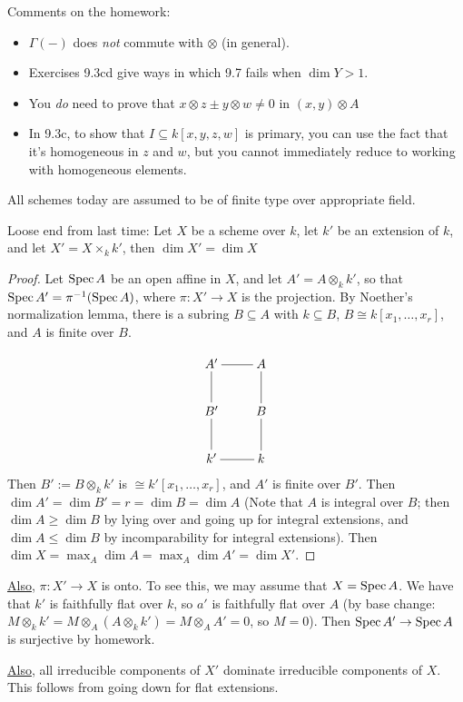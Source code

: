  \setcounter{lecture}{27}

 Comments on the homework:
 \begin{itemize}
 \item $\Gamma(-)$ does \emph{not} commute with $\otimes$ (in
 general).
 \item Exercises 9.3cd give ways in which 9.7 fails when $\dim Y
 >1$.
 \item You \emph{do} need to prove that $x\otimes z \pm y\otimes
 w\not=0$ in $(x,y)\otimes A$
 \item In 9.3c, to show that $I\subseteq k[x,y,z,w]$ is primary,
 you can use the fact that it's homogeneous in $z$ and $w$, but
 you cannot immediately reduce to working with homogeneous
 elements.
 \end{itemize}

 All schemes today are assumed to be of finite type over
 appropriate field.

 Loose end from last time:  Let $X$ be a scheme over $k$, let
 $k'$ be an extension of $k$, and let $X'=X\times_k k'$, then
 $\dim X' = \dim X$
 \begin{proof}
 Let $\text{\rm Spec\,} A$ be an open affine in $X$, and let $A'=A\otimes_k
 k'$, so that $\text{\rm Spec\,} A' = \pi^{-1}(\text{\rm Spec\,} A)$, where $\pi:X'\to X$
 is the projection.  By Noether's normalization lemma, there is a
 subring $B\subseteq A$ with $k\subseteq B$, $B\cong k[x_1,\dots,
 x_r]$, and $A$ is finite over $B$.

 \[\xymatrix{
  A'\ar@{-}[r]\ar@{-}[d] & A\ar@{-}[d] \\
  B'\ar@{-}[d] & B\ar@{-}[d] \\
  k' \ar@{-}[r] & k
 }\]
 Then $B':=B\otimes_k k'$ is $\cong k'[x_1,\dots,x_r]$, and $A'$
 is finite over $B'$.  Then $\dim A'= \dim B' = r = \dim B = \dim
 A$ (Note that $A$ is integral over $B$; then $\dim A \ge \dim B$
 by lying over and going up for integral extensions, and $\dim
 A\le \dim B$ by incomparability for integral extensions).  Then
 $\dim X = \max_A \dim A = \max_A \dim A' = \dim X'$.
 \end{proof}

 \underline{Also}, $\pi:X'\to X$ is onto.  To see this, we may assume that $X=\text{\rm Spec\,}
 A$.  We have that $k'$ is faithfully flat over $k$, so $a'$ is
 faithfully flat over $A$ (by base change: $M\otimes_k k' =
 M\otimes_A(A\otimes_k k') = M\otimes_A A' = 0$, so $M=0$).  Then
 $\text{\rm Spec\,} A'\to \text{\rm Spec\,} A$ is surjective by homework.

 \underline{Also}, all irreducible components of $X'$ dominate irreducible
 components of $X$.  This follows from going down for flat
 extensions.

